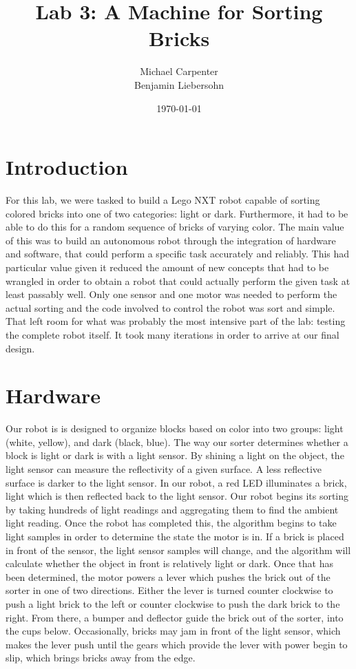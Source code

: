 \documentclass{article}
\title{Lab 3: A Machine for Sorting Bricks}
\author{Michael Carpenter \\ Benjamin Liebersohn}
\date{\today}
\begin{document}
\maketitle

\section{Introduction}
For this lab, we were tasked to build a Lego NXT robot capable of sorting colored bricks into one of two categories: light or dark.
Furthermore, it had to be able to do this for a random sequence of bricks of varying color.
The main value of this was to build an autonomous robot through the integration of hardware and software, that could perform a specific task accurately and reliably. 
This had particular value given it reduced the amount of new concepts that had to be wrangled in order to obtain a robot that could actually perform the given task at least passably well.
Only one sensor and one motor was needed to perform the actual sorting and the code involved to control the robot was sort and simple.
That left room for what was probably the most intensive part of the lab: testing the complete robot itself. It took many iterations in order to arrive at our final design.

\section{Hardware}
Our robot is is designed to organize blocks based on color into two groups: light (white, yellow), and dark (black, blue). 
The way our sorter determines whether a block is light or dark is with a light sensor. 
By shining a light on the object, the light sensor can measure the reflectivity of a given surface. 
A less reflective surface is darker to the light sensor. 
In our robot, a red LED illuminates a brick, light which is then reflected back to the light sensor. 
Our robot begins its sorting by taking hundreds of light readings and aggregating them to find the ambient light reading. 
Once the robot has completed this, the algorithm begins to take light samples in order to determine the state the motor is in. 
If a brick is placed in front of the sensor, the light sensor samples will change, and the algorithm will calculate whether the object in front is relatively light or dark. 
Once that has been determined, the motor powers a lever which pushes the brick out of the sorter in one of two directions.
Either the lever is turned counter clockwise to push a light brick to the left or counter clockwise to push the dark brick to the right. 
From there, a bumper and deflector guide the brick out of the sorter, into the cups below. 
Occasionally, bricks may jam in front of the light sensor, which makes the lever push until the gears which provide the lever with power begin to slip, which brings bricks away from the edge.
\end{document}
